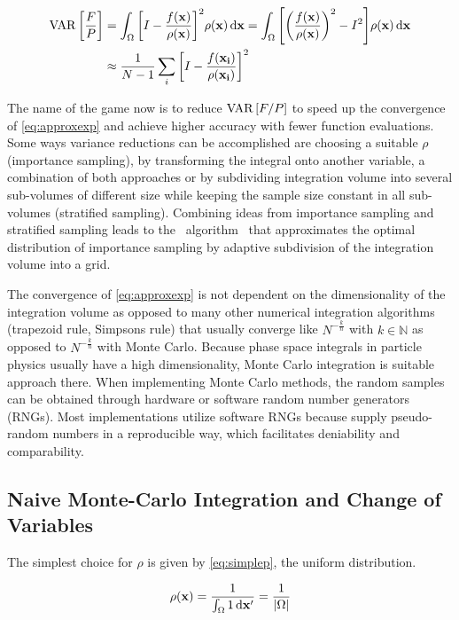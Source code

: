 \begin{align}
  \operatorname{VAR}\qty[\frac{F}{P}] &= \int_\Omega \qty[I -
  \frac{f(\vb{x})}{\rho(\vb{x})}]^2 \rho({\vb{x}}) \dd{\vb{x}} =
  \int_\Omega \qty[\qty(\frac{f(\vb{x})}{\rho(\vb{x})})^2 -
  I^2]\rho({\vb{x}}) \dd{\vb{x}}   \label{eq:varI}
 \\
  &\approx \frac{1}{N - 1}\sum_i \qty[I -
  \frac{f(\vb{x_i})}{\rho(\vb{x_i})}]^2  \label{eq:varI-approx}
\end{align}

The name of the game now is to reduce \(\operatorname{VAR}\qty[F/P]\) to speed up the
convergence of \cref{eq:approxexp} and achieve higher accuracy with
fewer function evaluations. Some ways variance reductions can be
accomplished are choosing a suitable \(\rho\) (importance sampling),
by transforming the integral onto another variable, a combination of
both approaches or by subdividing integration volume into several
sub-volumes of different size while keeping the sample size constant
in all sub-volumes (stratified sampling). Combining ideas from
importance sampling and stratified sampling leads to the \vegas\
algorithm~\cite{Lepage:19781an} that approximates the optimal
distribution of importance sampling by adaptive subdivision of the
integration volume into a grid.

The convergence of \cref{eq:approxexp} is not dependent on the
dimensionality of the integration volume as opposed to many other
numerical integration algorithms (trapezoid rule, Simpsons rule) that
usually converge like \(N^{-\frac{k}{n}}\) with \(k\in\mathbb{N}\) as
opposed to \(N^{-\frac{k}{n}}\) with Monte Carlo. Because phase space
integrals in particle physics usually have a high dimensionality,
Monte Carlo integration is suitable approach there. When implementing
Monte Carlo methods, the random samples can be obtained through
hardware or software random number generators (RNGs). Most
implementations utilize software RNGs because supply pseudo-random
numbers in a reproducible way, which facilitates deniability and
comparability.~\cite{buckley:2011ge}

\subsection{Naive Monte-Carlo Integration and Change of Variables}
\label{sec:naivechange}

The simplest choice for \(\rho\) is given
by \cref{eq:simplep}, the uniform distribution.

\begin{equation}
  \label{eq:simplep}
  \rho(\vb{x}) = \frac{1}{\int_{\Omega}1\dd{\vb{x'}}} =
  \frac{1}{\abs{\Omega}}
\end{equation}

